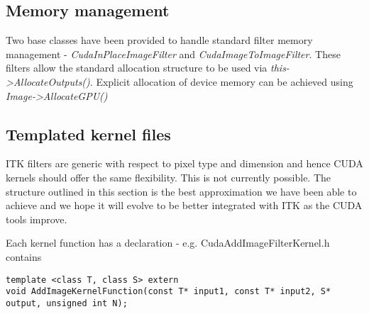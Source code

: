 \documentclass{InsightArticle}
\begin{document}
\subsection{Memory management}
Two base classes have been provided to handle standard filter memory
management - {\em CudaInPlaceImageFilter} and {\em
CudaImageToImageFilter}. These filters allow the standard allocation
structure to be used via {\em this->AllocateOutputs()}. Explicit
allocation of device memory can be achieved using
{\em Image->AllocateGPU()}

\subsection{Templated kernel files}
ITK filters are generic with respect to pixel type and dimension and
hence CUDA kernels should offer the same flexibility. This is not
currently possible. The structure outlined in this section is the best
approximation we have been able to achieve and we hope it will evolve
to be better integrated with ITK as the CUDA tools improve.

Each kernel function has a declaration - e.g. CudaAddImageFilterKernel.h contains
\begin{verbatim}
template <class T, class S> extern
void AddImageKernelFunction(const T* input1, const T* input2, S* output, unsigned int N);
\end{verbatim}
\end{document}

